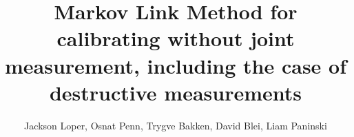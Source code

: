 



\DeclareMathOperator*{\tr}{tr}

\newcommand{\UN}[1]{\ensuremath{\left|#1\right|_\infty}}
\newcommand{\TV}[1]{\ensuremath{\left\Vert #1\right\Vert_{TV}}}
\newcommand{\EN}[1]{\ensuremath{\left|#1\right|}}
\newcommand{\kldiv}[2]{\ensuremath{D\left(#1||#2\right)}}

\newcommand{\figgygr}[2]{\texttt{[image: \#2]}}
\newcommand{\figgygrs}[3]{\begin{tabular}{c}\texttt{[image: \#2]}\\#3\end{tabular}}
\newcommand{\figgygrsTable}[3]{\begin{tabular}{c}{#2}\\#3\end{tabular}}
\newcommand{\figgygrsH}[3]{\begin{tabular}{c}\texttt{[image: \#2]}\\#3\end{tabular}}




\newcommand{\figgy}[1]{\begin{figure}\fbox{\begin{minipage}{\textwidth}#1\end{minipage}}\end{figure}}

\usepackage{cancel}


\title{Markov Link Method for calibrating without joint measurement, including the case of destructive measurements}
\author{Jackson Loper, Osnat Penn, Trygve Bakken, David Blei, Liam Paninski}

